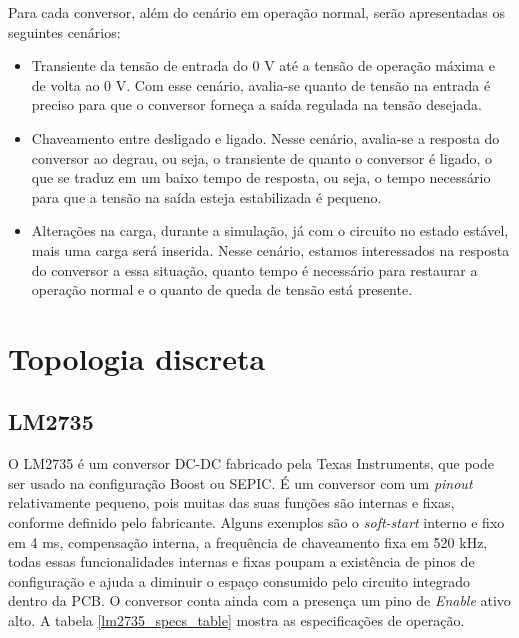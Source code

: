 Para cada conversor, além do cenário em operação normal, serão apresentadas os seguintes cenários:
\begin{itemize}
    \item Transiente da tensão de entrada do 0 V até a tensão de operação máxima e de volta ao 0 V. Com esse cenário, avalia-se quanto de tensão na entrada é preciso para que o conversor forneça a saída regulada na tensão desejada.
    \item Chaveamento entre desligado e ligado. Nesse cenário, avalia-se a resposta do conversor ao degrau, ou seja, o transiente de quanto o conversor é ligado, o que se traduz em um baixo tempo de resposta, ou seja, o tempo necessário para que a tensão na saída esteja estabilizada é pequeno.
    \item Alterações na carga, durante a simulação, já com o circuito no estado estável, mais uma carga será inserida. Nesse cenário, estamos interessados na resposta do conversor a essa situação, quanto tempo é necessário para restaurar a operação normal e o quanto de queda de tensão está presente. 
\end{itemize}


\section{Topologia discreta}

\subsection*{LM2735}

\noindent
\begin{minipage}{\linewidth}
\label{fig:lm2735_stock}
\end{minipage}

O LM2735 \cite{lm2735_datasheet} é um conversor DC-DC fabricado pela Texas Instruments, que pode ser usado na configuração Boost ou SEPIC. É um conversor com um \textit{pinout} relativamente pequeno, pois muitas das suas funções são internas e fixas, conforme definido pelo fabricante. Alguns exemplos são o \textit{soft-start} interno e fixo em 4 ms, compensação interna, a frequência de chaveamento fixa em 520 kHz, todas essas funcionalidades internas e fixas poupam a existência de pinos de configuração e ajuda a diminuir o espaço consumido pelo circuito integrado dentro da PCB. O conversor conta ainda com a presença um pino de \textit{Enable} ativo alto. A tabela \ref{lm2735_specs_table} mostra as especificações de operação.

